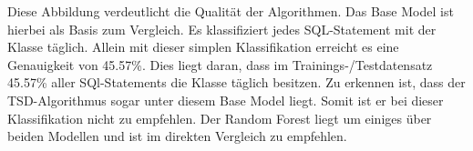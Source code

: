 Diese Abbildung verdeutlicht die Qualität der Algorithmen. Das Base Model ist hierbei als Basis zum Vergleich. Es klassifiziert jedes SQL-Statement mit der Klasse täglich. Allein mit dieser simplen Klassifikation erreicht es eine Genauigkeit von 45.57\%. Dies liegt daran, dass im Trainings-/Testdatensatz 45.57\% aller SQl-Statements die Klasse täglich besitzen. Zu erkennen ist, dass der TSD-Algorithmus sogar unter diesem Base Model liegt. Somit ist er  bei dieser Klassifikation nicht zu empfehlen. Der Random Forest liegt um einiges über beiden Modellen und ist im direkten Vergleich zu empfehlen.



